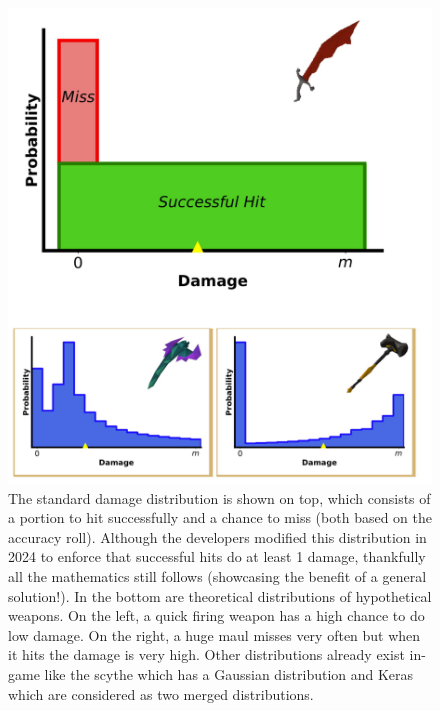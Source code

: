 		\begin{figure}
		\centering
		\includegraphics[width=\linewidth]{img/combat/damage_distributions.png}
		\caption{
			The standard damage distribution is shown on top, which consists of a portion to hit successfully and a chance to miss (both based on the accuracy roll). Although the developers modified this distribution in 2024 to enforce that successful hits do at least 1 damage, thankfully all the mathematics still follows (showcasing the benefit of a general solution!). In the bottom are theoretical distributions of hypothetical weapons. On the left, a quick firing weapon has a high chance to do low damage. On the right, a huge maul misses very often but when it hits the damage is very high. Other distributions already exist in-game like the scythe which has a Gaussian distribution and Keras which are considered as two merged distributions. 
		}
		\label{fig:damage_distributions}
	\end{figure}

